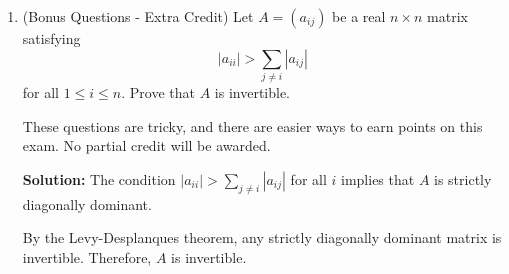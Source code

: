 \documentclass[12pt]{article}
\newcommand{\qspace}{\vspace{1em}} %
\newenvironment{solution}{\noindent\textbf{Solution:} }{\qspace}
\begin{document}
\begin{enumerate}
\begin{solution}
    Then:
    \[
    A^2 \mathbf{v} = \lambda^2 \mathbf{v}
    \]
    Thus, the eigenvalues of \( A^2 \) are \( \lambda^2 \), which are nonnegative.

    The eigenvalues of \( I_n + A^2 \) are \( 1 + \lambda^2 \), which are always \( \geq 1 \).

    Since all eigenvalues of \( I_n + A^2 \) are positive, \( \det(I_n + A^2) \) is the product of positive numbers, hence \( \det(I_n + A^2) \geq 0 \).
    \end{solution}
        
    \item (Bonus Questions - Extra Credit) Let \( A = (a_{ij}) \) be a real \( n \times n \) matrix satisfying
\[
|a_{ii}| > \sum_{j \neq i} |a_{ij}|
\]
for all \( 1 \leq i \leq n \). Prove that \( A \) is invertible.

\noindent{} These questions are tricky, and there are easier ways to earn points on this exam. No partial credit will be awarded.    
    
    \begin{solution}
    The condition \( |a_{ii}| > \sum_{j \neq i} |a_{ij}| \) for all \( i \) implies that \( A \) is strictly diagonally dominant.

    By the Levy-Desplanques theorem, any strictly diagonally dominant matrix is invertible. Therefore, \( A \) is invertible.
    \end{solution}
    
\end{enumerate}
\end{document}
